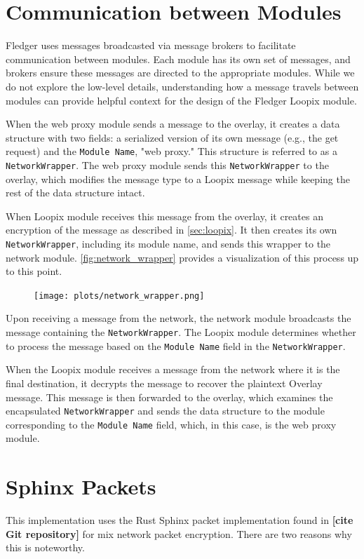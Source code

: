 \documentclass[a4paper,11pt,oneside]{report}
\begin{document}
\section{Communication between Modules}
Fledger uses messages broadcasted via message brokers to facilitate communication between modules. Each module has its own set of messages, and brokers ensure these messages are directed to the appropriate modules. While we do not explore the low-level details, understanding how a message travels between modules can provide helpful context for the design of the Fledger Loopix module.

When the web proxy module sends a message to the overlay, it creates a data structure with two fields: a serialized version of its own message (e.g., the get request) and the \texttt{Module Name}, "web proxy." This structure is referred to as a \texttt{NetworkWrapper}. The web proxy module sends this \texttt{NetworkWrapper} to the overlay, which modifies the message type to a Loopix message while keeping the rest of the data structure intact.

When Loopix module receives this message from the overlay, it creates an encryption of the message as described in \autoref{sec:loopix}. It then creates its own \texttt{NetworkWrapper}, including its module name, and sends this wrapper to the network module. \autoref{fig:network_wrapper} provides a visualization of this process up to this point.

\begin{figure}[H]
    \centering
    \texttt{[image: plots/network\_wrapper.png]}
    \caption{}
    \label{fig:network_wrapper}
\end{figure}

Upon receiving a message from the network, the network module broadcasts the message containing the \texttt{NetworkWrapper}. The Loopix module determines whether to process the message based on the \texttt{Module Name} field in the \texttt{NetworkWrapper}.

When the Loopix module receives a message from the network where it is the final destination, it decrypts the message to recover the plaintext Overlay message. This message is then forwarded to the overlay, which examines the encapsulated \texttt{NetworkWrapper} and sends the data structure to the module corresponding to the \texttt{Module Name} field, which, in this case, is the web proxy module.

\section{Sphinx Packets}
\label{sec:sphinx}
This implementation uses the Rust Sphinx packet implementation found in \textbf{[cite Git repository]} for mix network packet encryption. There are two reasons why this is noteworthy.
\end{document}
